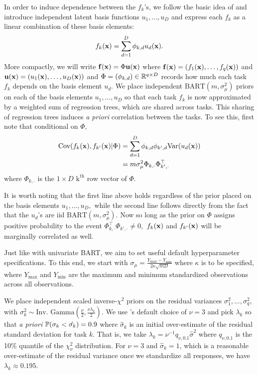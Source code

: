 \documentclass[12pt]{article}
\begin{document}
In order to induce dependence between the $f_{k}$'s, we follow the basic idea of \citet{Teh2005} and introduce independent latent basis functions $u_{1}, \ldots, u_{D}$ and express each $f_{k}$ as a linear combination of these basis elements:
$$
f_{k}(\bx) = \sum_{d = 1}^{D}{\phi_{k,d}u_{d}(\bx)}.
$$
More compactly, we will write $\bf(\bx) = \Phi\bu(\bx)$ where $\bf(\bx) = (f_{1}(\bx), \ldots, f_{q}(\bx))$ and $\bu(\bx) = (u_{1}(\bx), \ldots, u_{D}(\bx))$ and $\Phi = (\phi_{k,d}) \in \R^{q \times D}$ records how much each task $f_{k}$ depends on the basis element $u_{d}.$
We place independent $\text{BART}(m, \sigma^{2}_{\mu})$ priors on each of the basis elements $u_{1}, \ldots, u_{D}$ so that each task $f_{k}$ is now approximated by a weighted sum of regression trees, which are shared across tasks.
This sharing of regression trees induces \textit{a priori} correlation between the tasks.
To see this, first note that conditional on $\Phi,$
\begin{align*}
\text{Cov}(f_{k}(\bx), f_{k'}(\bx) | \Phi) &= \sum_{d = 1}^{D}{\phi_{k,d}\phi_{k',d}\text{Var}(u_{d}(\bx))} \\
&= m\sigma^{2}_{\mu}\Phi_{k,\cdot}\Phi_{k',\cdot}^{\top}
\end{align*}
where $\Phi_{k,\cdot}$ is the $1 \times D$ $\text{k}^{\text{th}}$ row vector of $\Phi.$

It is worth noting that the first line above holds regardless of the prior placed on the basis elements $u_{1}, \ldots, u_{D},$ while the second line follows directly from the fact that the $u_{d}$'s are iid $\text{BART}(m,\sigma^{2}_{\mu}).$
Now so long as the prior on $\Phi$ assigns positive probability to the event $\Phi_{k,\cdot}^{\top}\Phi_{k',\cdot} \neq 0,$ $f_{k}(\bx)$ and $f_{k'}(\bx)$ will be marginally correlated as well. 

Just like with univariate BART, we aim to set useful default hyperparameter specifications.
To this end, we start with $\sigma_{\mu} = \frac{Y_{\max} - Y_{\min}}{2\kappa \sqrt{mD}}$ where $\kappa$ is to be specified, where $Y_{\max}$ and $Y_{\min}$ are the maximum and minimum standardized observations across all observations.

We place independent scaled inverse-$\chi^{2}$ priors on the residual variances $\sigma^{2}_{1}, \ldots, \sigma^{2}_{q}$, with $\sigma^{2}_{k} \sim \text{Inv. Gamma}\left(\frac{\nu}{2}, \frac{\nu\lambda_{k}}{2}\right).$
We use \citet{Chipman2010}'s default choice of $\nu = 3$ and pick $\lambda_{k}$ so that \textit{a priori} $\P(\sigma_{k} < \hat{\sigma_{k}}) = 0.9$ where $\hat{\sigma}_{k}$ is an initial over-estimate of the residual standard deviation for task $k.$
That is, we take $\lambda_{k} = \nu^{-1}q_{\nu,0.1}\hat{\sigma}^{2}$ where $q_{\nu,0.1}$ is the 10\% quantile of the $\chi^{2}_{\nu}$ distribution.
For $\nu = 3$ and $\hat{\sigma}_{k} = 1$, which is a reasonable over-estimate of the residual variance once we standardize all responses, we have $\lambda_{k} \approx 0.195.$
\end{document}
